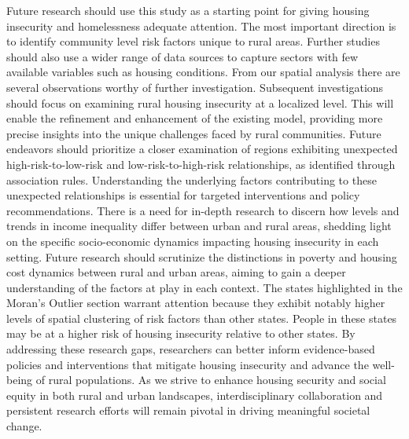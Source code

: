 Future research should use this study as a starting point for giving housing insecurity and homelessness adequate attention. The most important direction is to identify community level risk factors unique to rural areas. Further studies should also use a wider range of data sources to capture sectors with few available variables such as housing conditions. From our spatial analysis there are several observations worthy of further investigation. Subsequent investigations should focus on examining rural housing insecurity at a localized level. This will enable the refinement and enhancement of the existing model, providing more precise insights into the unique challenges faced by rural communities.	Future endeavors should prioritize a closer examination of regions exhibiting unexpected high-risk-to-low-risk and low-risk-to-high-risk relationships, as identified through association rules. Understanding the underlying factors contributing to these unexpected relationships is essential for targeted interventions and policy recommendations. There is a need for in-depth research to discern how levels and trends in income inequality differ between urban and rural areas, shedding light on the specific socio-economic dynamics impacting housing insecurity in each setting. Future research should scrutinize the distinctions in poverty and housing cost dynamics between rural and urban areas, aiming to gain a deeper understanding of the factors at play in each context. The states highlighted in the Moran's Outlier section warrant attention because they exhibit notably higher levels of spatial clustering of risk factors than other states. People in these states may be at a higher risk of housing insecurity relative to other states. By addressing these research gaps, researchers can better inform evidence-based policies and interventions that mitigate housing insecurity and advance the well-being of rural populations. As we strive to enhance housing security and social equity in both rural and urban landscapes, interdisciplinary collaboration and persistent research efforts will remain pivotal in driving meaningful societal change. 


\endinput